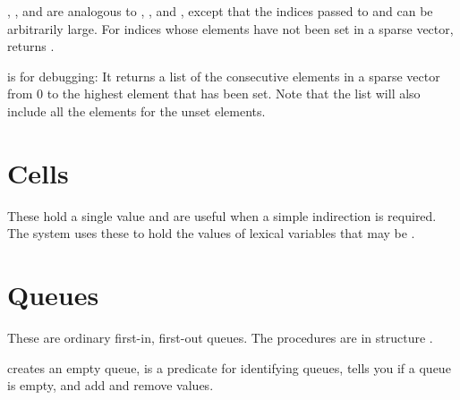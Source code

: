 \begin{protos}
\end{protos}
%
, , and
 are analogous to ,
, and , except that the indices
passed to  and  can
be arbitrarily large.  For indices whose elements have not been set in
a sparse vector,  returns .

 is for debugging: It returns a list of the
consecutive elements in a sparse vector from 0 to the highest element
that has been set.  Note that the list will also include all the
 elements for the unset elements.


\section{Cells}
\label{cells}

These hold a single value and are useful when a simple indirection is
 required.
The system uses these to hold the values of lexical variables that
 may be .

\begin{protos}
\end{protos}

\section{Queues}

These are ordinary first-in, first-out queues.
The procedures are in structure .

\begin{protos}
\end{protos}
\noindent 
{} creates an empty queue,  is a predicate for
 identifying queues,  tells you if a queue is empty,
  and  add and remove values.


